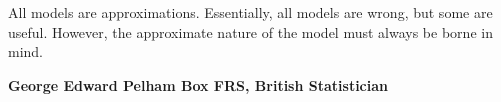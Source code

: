 \newpage


\vspace*{\fill}
\centering
All models are approximations. Essentially, all models are wrong, but some are useful. However, the approximate nature of the model must always be borne in mind.

\centering\textbf{George Edward Pelham Box FRS, British Statistician}
\vspace*{\fill}
